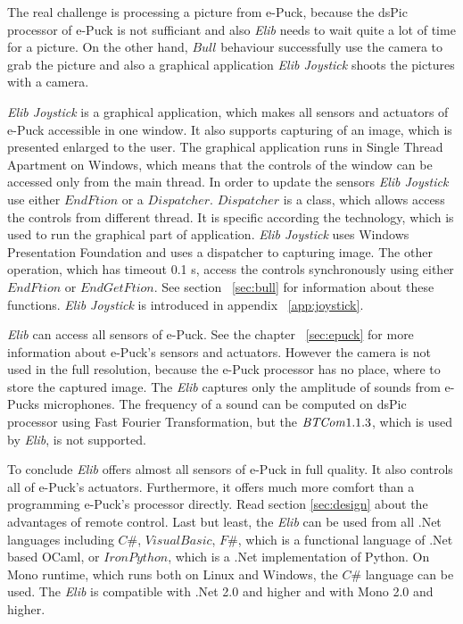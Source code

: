 	The real challenge is processing a picture from e-Puck, because the dsPic processor of e-Puck is not sufficiant
	and also {\it Elib} needs to wait quite a lot of time for a picture.
	On the other hand, $Bull$ behaviour successfully use the camera to grab the picture
	and also a graphical application {\it Elib Joystick} shoots the pictures with a camera.

	{\it Elib Joystick} is a graphical application, which makes all sensors and actuators of e-Puck accessible in one window.
	It also supports capturing of an image, which is presented enlarged to the user.
	The graphical application runs in Single Thread Apartment on Windows, which means that the controls of the window can 
	be accessed only from the main thread.
	In order to update the sensors {\it Elib Joystick} use either $EndFtion$ or a $Dispatcher$.
	$Dispatcher$ is a class, which allows access the controls from different thread. It is specific according the technology,
	which is used to run the graphical part of application. {\it Elib Joystick} uses Windows Presentation Foundation and
	uses a dispatcher to capturing image. The other operation, which has timeout 0.1 s, access the controls synchronously using
	either $EndFtion$ or $EndGetFtion$. See section ~\ref{sec:bull} for information about these functions.
	{\it Elib Joystick} is introduced in appendix ~\ref{app:joystick}.

	{\it Elib} can access all sensors of e-Puck. See the chapter ~\ref{sec:epuck} for more information about e-Puck's sensors and actuators.
	However the camera is not used in the full resolution,
	because the e-Puck processor has no place, where to store the captured image.
	The {\it Elib} captures only the amplitude of sounds from e-Pucks microphones. 
	The frequency of a sound can be computed on dsPic processor
	using Fast Fourier Transformation, but the ${\it BTCom} 1.1.3$, which is used by {\it Elib}, is not supported.

	To conclude {\it Elib} offers almost all sensors of e-Puck in full quality. It also controls all of e-Puck's actuators.
	Furthermore, it offers much more comfort than a programming e-Puck's processor directly. 
	Read section \ref{sec:design} about the advantages
	of remote control. 
	Last but least, the {\it Elib} can be used from all .Net languages including $C\#$, $Visual Basic$, $F\#$,
	which is a functional language of .Net based OCaml,
	or $Iron Python$, which is a .Net implementation of Python. On Mono runtime, 
	which runs both on Linux and Windows, the $C\#$ language can be used.
	The {\it Elib} is compatible with .Net 2.0\cite{net} and higher and with Mono\cite{mono} 2.0 and higher.

